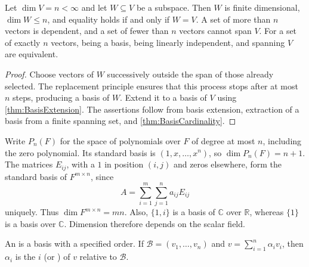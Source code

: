 
\begin{Corollary}\label{cor:DimensionTests}
Let $\dim V=n<\infty$ and let $W\subseteq V$ be a subspace. Then $W$ is finite dimensional, $\dim W\le n$, and equality holds if and only if $W=V$. A set of more than $n$ vectors is dependent, and a set of fewer than $n$ vectors cannot span $V$. For a set of exactly $n$ vectors, being a basis, being linearly independent, and spanning $V$ are equivalent.
\end{Corollary}
\begin{proof}
Choose vectors of $W$ successively outside the span of those already selected. The replacement principle ensures that this process stops after at most $n$ steps, producing a basis of $W$. Extend it to a basis of $V$ using \cref{thm:BasisExtension}. The assertions follow from basis extension, extraction of a basis from a finite spanning set, and \cref{thm:BasisCardinality}.
\end{proof}

\begin{Example}
Write $P_n(F)$ for the space of polynomials over $F$ of degree at most $n$, including the zero polynomial. Its standard basis is $(1,x,\ldots,x^n)$, so $\dim P_n(F)=n+1$. The matrices $E_{ij}$, with a $1$ in position $(i,j)$ and zeros elsewhere, form the standard basis of $F^{m\times n}$, since
\begin{equation*}
A=\sum_{i=1}^m\sum_{j=1}^n a_{ij}E_{ij}
\end{equation*}
uniquely. Thus $\dim F^{m\times n}=mn$. Also, $\{1,i\}$ is a basis of $\mathbb C$ over $\mathbb R$, whereas $\{1\}$ is a basis over $\mathbb C$. Dimension therefore depends on the scalar field.
\end{Example}

\begin{Definition}
An  is a basis with a specified order. If $\mathcal B=(v_1,\ldots,v_n)$ and $v=\sum_{i=1}^n\alpha_iv_i$, then $\alpha_i$ is the $i$\nth {} (or ) of $v$ relative to $\mathcal B$.
\end{Definition}

